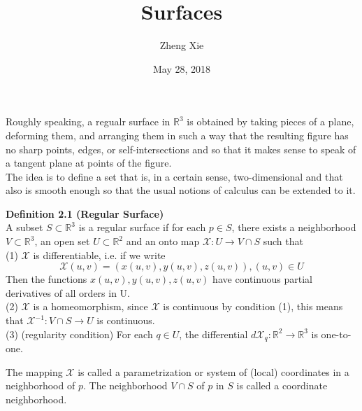 \documentclass{article}
\author{Zheng Xie}
\title{Surfaces}
\date{May 28, 2018}
\begin{document}
\maketitle
    
\setlength\parindent{0em}   %
\setlength\parskip{1.0\baselineskip} %

\par
Roughly speaking, a regualr surface in $\mathbb{R}^3$ is obtained by taking pieces of a plane,
deforming them, and arranging them in such a way that the resulting figure has no sharp points, edges, or self-intersections
and so that it makes sense to speak of a tangent plane at points of the figure.\\
The idea is to define a set that is, in a certain sense, two-dimensional and that also is smooth
enough so that the usual notions of calculus can be extended to it.
    
\par
\textbf{Definition 2.1 (Regular Surface)}\\
A subset $S \subset \mathbb R^3$ is a regular surface if for each $p \in S$, there exists a neighborhood
$V \subset \mathbb R^3$, an open set $U \subset \mathbb R^2$ and an onto map $\mathcal{X}:U \to V \cap S$ such that\\
(1) $\mathcal{X}$ is differentiable, i.e. if we write\\
$$
    \mathcal{X}(u,v) = (x(u,v), y(u,v), z(u,v)), (u,v) \in U
$$
Then the functions $x(u,v), y(u,v), z(u,v)$ have continuous partial derivatives of all orders in U.\\
(2) $\mathcal{X}$ is a homeomorphism, since $\mathcal{X}$ is continuous by condition (1), this means that 
$\mathcal{X}^{-1}: V \cap S \to U$ is continuous.\\
(3) (regularity condition) For each $q \in U$, the differential $d\mathcal{X}_q: \mathbb{R}^2 \to \mathbb{R}^3$
is one-to-one.

\par
The mapping $\mathcal{X}$ is called a parametrization or system of (local) coordinates
in a neighborhood of $p$. The neighborhood $V \cap S$ of $p$ in $S$ is called a coordinate neighborhood.
\end{document}
